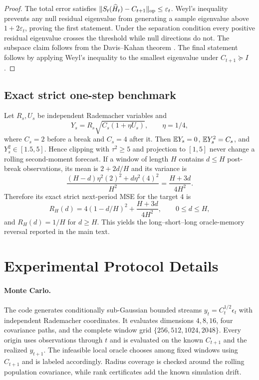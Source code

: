 \begin{proof}
The total error satisfies $\|S_t(\widehat H_t)-C_{t+1}\|_{\mathrm{op}}\le\varepsilon_t$.  Weyl's inequality prevents any null residual eigenvalue from generating a sample eigenvalue above $1+2\varepsilon_t$, proving the first statement.  Under the separation condition every positive residual eigenvalue crosses the threshold while null directions do not.  The subspace claim follows from the Davis--Kahan theorem \citep{davis1970rotation}.  The final statement follows by applying Weyl's inequality to the smallest eigenvalue under $C_{t+1}\succeq I$.  \end{proof}

\subsection{Exact strict one-step benchmark}
\label{app:benchmark}

Let $R_s,U_s$ be independent Rademacher variables and
\begin{equation}
 Y_s=R_s\sqrt{C_s(1+\eta U_s)},\qquad \eta=1/4,
\end{equation}
where $C_s=2$ before a break and $C_s=4$ after it.  Then $\mathbb E Y_s=0$, $\mathbb E Y_s^2=C_s$, and $Y_s^2\in[1.5,5]$.  Hence clipping with $\tau^2\ge5$ and projection to $[1,5]$ never change a rolling second-moment forecast.  If a window of length $H$ contains $d\le H$ post-break observations, its mean is $2+2d/H$ and its variance is
\begin{equation}
 \frac{(H-d)\eta^2(2)^2+d\eta^2(4)^2}{H^2}=\frac{H+3d}{4H^2}.
\end{equation}
Therefore its exact strict next-period MSE for the target $4$ is
\begin{equation}
 R_H(d)=4(1-d/H)^2+\frac{H+3d}{4H^2},\qquad 0\le d\le H,
\end{equation}
and $R_H(d)=1/H$ for $d\ge H$.  This yields the long--short--long oracle-memory reversal reported in the main text.

\section{Experimental Protocol Details}
\label{app:experiments}

\paragraph{Monte Carlo.}
The code generates conditionally sub-Gaussian bounded streams $y_t=C_t^{1/2}\epsilon_t$ with independent Rademacher coordinates.  It evaluates dimensions $4,8,16$, four covariance paths, and the complete window grid $\{256,512,1024,2048\}$.  Every origin uses observations through $t$ and is evaluated on the known $C_{t+1}$ and the realized $y_{t+1}$.  The infeasible local oracle chooses among fixed windows using $C_{t+1}$ and is labeled accordingly.  Radius coverage is checked around the rolling population covariance, while rank certificates add the known simulation drift.


